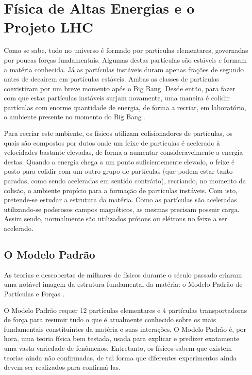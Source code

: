 \chapter{Física de Altas Energias e o Projeto LHC}
\label{chap:lhc}

Como se sabe, tudo no universo é formado por partículas elementares, governadas por poucas forças fundamentais. Algumas destas partículas são estáveis e formam a matéria conhecida. Já as partículas instáveis duram apenas frações de segundo antes de decaírem em partículas estáveis. Ambas as classes de partículas coexistiram por um breve momento após o Big Bang. Desde então, para fazer com que estas partículas instáveis surjam novamente, uma maneira é colidir partículas com enorme quantidade de energia, de forma a recriar, em laboratório, o ambiente presente no momento do Big Bang \cite{bib:cern}.

Para recriar este ambiente, os físicos utilizam colisionadores de partículas, os quais são compostos por dutos onde um feixe de partículas é acelerado à velocidades bastante elevadas, de forma a aumentar consideravelmente a energia destas. Quando a energia chega a um ponto suficientemente elevado, o feixe é posto para colidir com um outro grupo de partículas (que podem estar tanto paradas, como sendo aceleradas em sentido contrário), recriando, no momento da colisão, o ambiente propício para a formação de partículas instáveis. Com isto, pretende-se estudar a estrutura da matéria. Como as partículas são aceleradas utilizando-se poderosos campos magnéticos, as mesmas precisam possuir carga. Assim sendo, normalmente são utilizados prótons ou elétrons no feixe a ser acelerado.

\section{O Modelo Padrão}

As teorias e descobertas de milhares de físicos durante o século passado criaram uma notável imagem da estrutura fundamental da matéria: o Modelo Padrão de Partículas e Forças \cite{bib:hep}.

O Modelo Padrão requer 12 partículas elementares e 4 partículas transportadoras de força para resumir tudo o que é atualmente conhecido sobre os mais fundamentais constituintes da matéria e suas interações. O Modelo Padrão é, por hora, uma teoria física bem testada, usada para explicar e predizer exatamente uma vasta variedade de fenômenos. Entretanto, os físicos sabem que existem teorias ainda não confirmadas, de tal forma que diferentes experimentos ainda devem ser realizados para confirmá-las.


